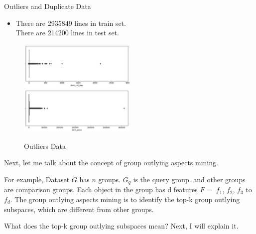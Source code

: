 \documentclass[
 size=12pt,
 paper=smartboard,  %
 mode=present, 		%
 display=slides, 	%
 style=tuliplab,  	%
 pauseslide,
 fleqn,leqno]{powerdot}
\begin{document}
\begin{slide}{Outliers and Duplicate Data}
\begin{itemize}
  \item
  There are 2935849 lines in train set. \\
  \smallskip
  There are 214200 lines in test set.\\
\end{itemize}
\vspace{0.75cm}
  \begin{figure}[htbp]
    \centering
    \includegraphics[width=0.5\textwidth,height=0.4\textwidth]{figures/Figure2.eps}\\
    \caption{Outliers Data}
  \end{figure}
    
 

\begin{note}
Next,
let me talk about the concept of group outlying aspects mining.

For example,
Dataset $G$ has $n$ groups.
$G_q$ is the query group.
and other groups are comparison groups.
Each object in the group has d features $F = $ $f_1$, $f_2$, $f_3$ to $f_d$.
The group outlying aspects mining is to identify the top-k group outlying subspaces,
which are different from other groups.

What does the top-k group outlying subspaces mean?
Next, I will explain it.
\end{note}

\end{slide}
\end{document}
